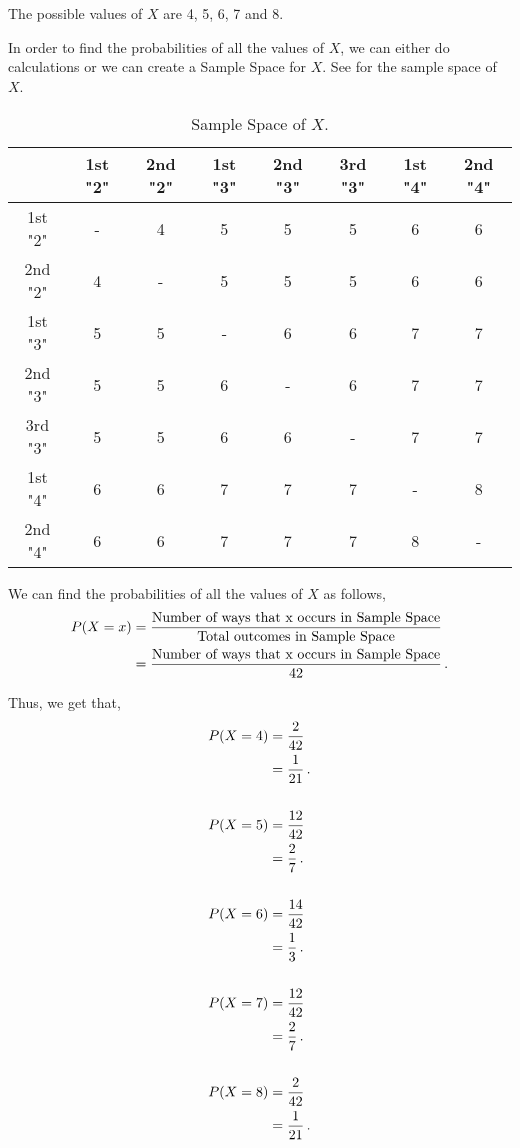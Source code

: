 \begin{subquestions}
\begin{subsubquestions}

\subsubquestion

The possible values of $X$ are 4, 5, 6, 7 and 8.


\subsubquestion

In order to find the probabilities of all the values of $X$, we can either do calculations or we can create a Sample Space for $X$. See  for the sample space of $X$.

\begin{table}[ht]
	\centering
	\begin{tabular}{|c|c|c|c|c|c|c|c|}	
	\hline
	  & 1st "2" & 2nd "2" & 1st "3" & 2nd "3" & 3rd "3" & 1st "4" & 2nd "4" \\
	\hline 
	1st "2" & - & 4 & 5 & 5 & 5 & 6 & 6 \\
	\hline
	2nd "2" & 4 & - & 5 & 5 & 5 & 6 & 6 \\
	\hline
	1st "3" & 5 & 5 & - & 6 & 6 & 7 & 7 \\
	\hline
	2nd "3" & 5 & 5 & 6 & - & 6 & 7 & 7  \\
	\hline
	3rd "3" & 5 & 5 & 6 & 6 & - & 7 & 7 \\
	\hline
	1st "4" & 6 & 6 & 7 & 7 & 7 & - & 8  \\
	\hline
	2nd "4" & 6 & 6 & 7 & 7 & 7 & 8 & -  \\
	\hline	
	\end{tabular}
	\caption{\label{2012:q4:Sample} Sample Space of $X$.}
\end{table}

We can find the probabilities of all the values of $X$ as follows,
\begin{align}
	P(X=x) & = \frac{\text{Number of ways that x occurs in Sample Space}}{\text{Total outcomes in Sample Space}} \nonumber \\
	       & = \frac{\text{Number of ways that x occurs in Sample Space}}{42}\,.	
\end{align}

Thus, we get that,
\begin{align}
	P(X=4) & = \frac{2}{42} \nonumber \\
	       & = \frac{1}{21} \,. \\ \nonumber \\
	P(X=5) & = \frac{12}{42} \nonumber \\
	       & = \frac{2}{7} \,.	\\ \nonumber \\
	P(X=6) & = \frac{14}{42} \nonumber \\
	       & = \frac{1}{3} \,. \\ \nonumber \\
	P(X=7) & = \frac{12}{42} \nonumber \\
		   & = \frac{2}{7} \,.\\ \nonumber \\
	P(X=8) & = \frac{2}{42} \nonumber \\
		   & = \frac{1}{21} \,.	   
\end{align}


\end{subsubquestions}
\end{subquestions}
